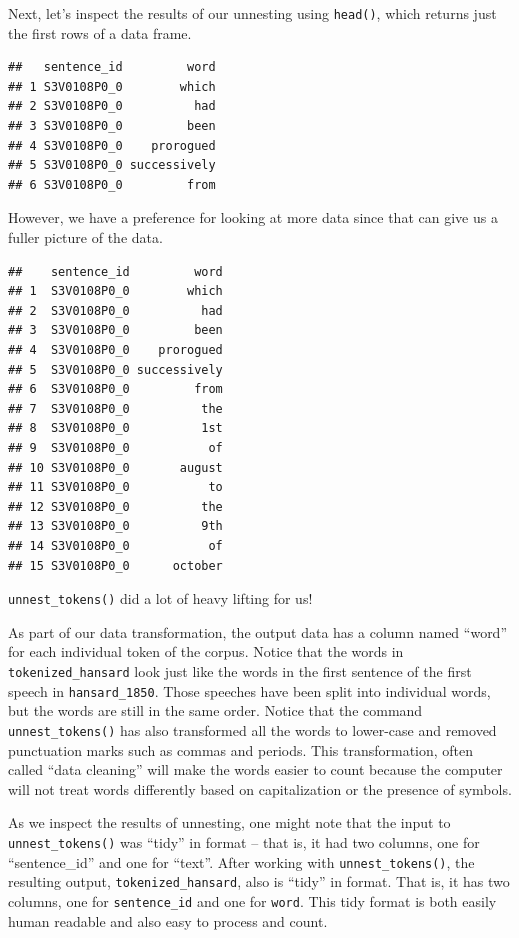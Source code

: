 \documentclass[
]{article}
\begin{document}
Next, let's inspect the results of our unnesting using \texttt{head()},
which returns just the first rows of a data frame.

\begin{verbatim}
##   sentence_id         word
## 1 S3V0108P0_0        which
## 2 S3V0108P0_0          had
## 3 S3V0108P0_0         been
## 4 S3V0108P0_0    prorogued
## 5 S3V0108P0_0 successively
## 6 S3V0108P0_0         from
\end{verbatim}

However, we have a preference for looking at more data since that can
give us a fuller picture of the data.

\begin{verbatim}
##    sentence_id         word
## 1  S3V0108P0_0        which
## 2  S3V0108P0_0          had
## 3  S3V0108P0_0         been
## 4  S3V0108P0_0    prorogued
## 5  S3V0108P0_0 successively
## 6  S3V0108P0_0         from
## 7  S3V0108P0_0          the
## 8  S3V0108P0_0          1st
## 9  S3V0108P0_0           of
## 10 S3V0108P0_0       august
## 11 S3V0108P0_0           to
## 12 S3V0108P0_0          the
## 13 S3V0108P0_0          9th
## 14 S3V0108P0_0           of
## 15 S3V0108P0_0      october
\end{verbatim}

\texttt{unnest\_tokens()} did a lot of heavy lifting for us!

As part of our data transformation, the output data has a column named
``word'' for each individual token of the corpus. Notice that the words
in \texttt{tokenized\_hansard} look just like the words in the first
sentence of the first speech in \texttt{hansard\_1850}. Those speeches
have been split into individual words, but the words are still in the
same order. Notice that the command \texttt{unnest\_tokens()} has also
transformed all the words to lower-case and removed punctuation marks
such as commas and periods. This transformation, often called ``data
cleaning'' will make the words easier to count because the computer will
not treat words differently based on capitalization or the presence of
symbols.

As we inspect the results of unnesting, one might note that the input to
\texttt{unnest\_tokens()} was ``tidy'' in format -- that is, it had two
columns, one for ``sentence\_id'' and one for ``text''. After working
with \texttt{unnest\_tokens()}, the resulting output,
\texttt{tokenized\_hansard}, also is ``tidy'' in format. That is, it has
two columns, one for \texttt{sentence\_id} and one for \texttt{word}.
This tidy format is both easily human readable and also easy to process
and count.
\end{document}
